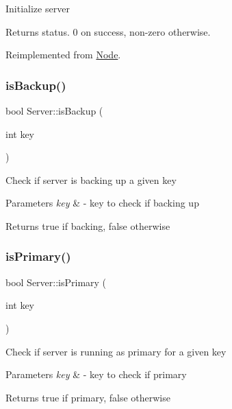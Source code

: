 Initialize server

\begin{DoxyReturn}{Returns}
status. 0 on success, non-\/zero otherwise. 
\end{DoxyReturn}


Reimplemented from \mbox{\hyperlink{classNode_acfbc12d3b7d414fb12811041b04a1809}{Node}}.

\mbox{\label{classServer_a66708ca0f53116a15258353cc60d1fd4}} 
\subsubsection{\texorpdfstring{is\+Backup()}{isBackup()}}
{\footnotesize\ttfamily bool Server\+::is\+Backup (\begin{DoxyParamCaption}\item[{int}]{key }\end{DoxyParamCaption})}

Check if server is backing up a given key


\begin{DoxyParams}{Parameters}
{\em key} & -\/ key to check if backing up\\
\hline
\end{DoxyParams}
\begin{DoxyReturn}{Returns}
true if backing, false otherwise 
\end{DoxyReturn}
\mbox{\label{classServer_a9bd7a3b2b12f2f5bddd68eb245111d02}} 
\subsubsection{\texorpdfstring{is\+Primary()}{isPrimary()}}
{\footnotesize\ttfamily bool Server\+::is\+Primary (\begin{DoxyParamCaption}\item[{int}]{key }\end{DoxyParamCaption})}

Check if server is running as primary for a given key


\begin{DoxyParams}{Parameters}
{\em key} & -\/ key to check if primary\\
\hline
\end{DoxyParams}
\begin{DoxyReturn}{Returns}
true if primary, false otherwise 
\end{DoxyReturn}
\mbox{\label{classServer_afb4289a5db1c23ac566dbb085a8f91fb}} 
